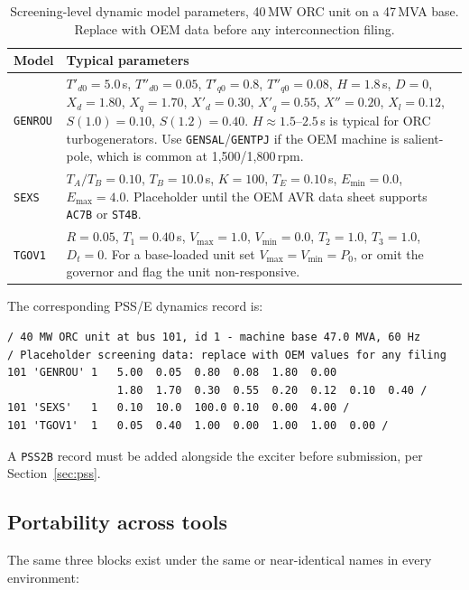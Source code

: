 \begin{table}[htbp]
  \centering
  \small
  \renewcommand{\arraystretch}{1.25}
  \begin{tabularx}{\linewidth}{@{}l X@{}}
    \toprule
    \textbf{Model} & \textbf{Typical parameters} \\
    \midrule
    \texttt{GENROU}
      & $T'_{d0}=5.0$\,s, $T''_{d0}=0.05$, $T'_{q0}=0.8$, $T''_{q0}=0.08$,
        $H=1.8$\,s, $D=0$, $X_d=1.80$, $X_q=1.70$, $X'_d=0.30$, $X'_q=0.55$,
        $X''=0.20$, $X_l=0.12$, $S(1.0)=0.10$, $S(1.2)=0.40$. \newline
        $H \approx 1.5$--$2.5$\,s is typical for ORC turbogenerators. Use
        \texttt{GENSAL}/\texttt{GENTPJ} if the OEM machine is salient-pole,
        which is common at 1{,}500/1{,}800\,rpm. \\
    \texttt{SEXS}
      & $T_A/T_B=0.10$, $T_B=10.0$\,s, $K=100$, $T_E=0.10$\,s,
        $E_{\min}=0.0$, $E_{\max}=4.0$. Placeholder until the OEM AVR data
        sheet supports \texttt{AC7B} or \texttt{ST4B}. \\
    \texttt{TGOV1}
      & $R=0.05$, $T_1=0.40$\,s, $V_{\max}=1.0$, $V_{\min}=0.0$, $T_2=1.0$,
        $T_3=1.0$, $D_t=0$. For a base-loaded unit set
        $V_{\max}=V_{\min}=P_0$, or omit the governor and flag the unit
        non-responsive. \\
    \bottomrule
  \end{tabularx}
  \caption{Screening-level dynamic model parameters, 40\,MW ORC unit on a
           47\,MVA base. Replace with OEM data before any interconnection
           filing.}
  \label{tab:dyn-params}
\end{table}

\noindent
The corresponding PSS/E dynamics record is:

{\small
\begin{verbatim}
/ 40 MW ORC unit at bus 101, id 1 - machine base 47.0 MVA, 60 Hz
/ Placeholder screening data: replace with OEM values for any filing
101 'GENROU' 1   5.00  0.05  0.80  0.08  1.80  0.00
                 1.80  1.70  0.30  0.55  0.20  0.12  0.10  0.40 /
101 'SEXS'   1   0.10  10.0  100.0 0.10  0.00  4.00 /
101 'TGOV1'  1   0.05  0.40  1.00  0.00  1.00  1.00  0.00 /
\end{verbatim}}

\noindent
A \texttt{PSS2B} record must be added alongside the exciter before submission,
per Section~\ref{sec:pss}.

\subsection{Portability across tools}
The same three blocks exist under the same or near-identical names in every
environment:

